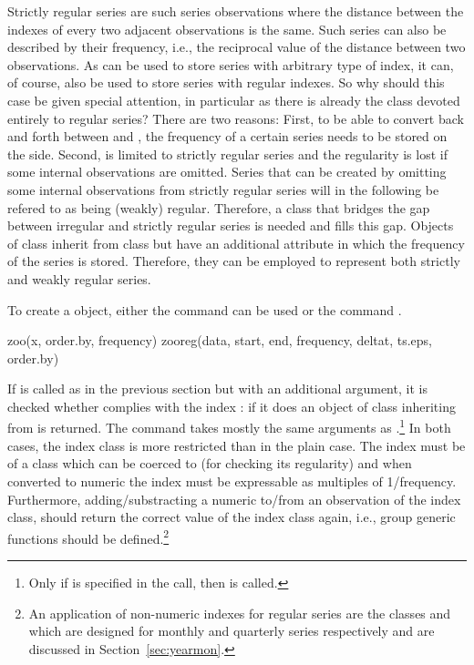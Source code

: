 \documentclass[article,nojss]{jss}
\begin{document}
Strictly regular series are such series observations where the distance between
the indexes of every two adjacent observations is the same. Such series can 
also be described by their frequency, i.e., the reciprocal value of the distance
between two observations. As  can be used to store series with arbitrary
type of index, it can, of course, also be used to store series with regular indexes.
So why should this case be given special attention, in particular as there is already
the  class devoted entirely to regular series? There are two reasons: First,
to be able to convert back and forth between  and , the frequency
of a certain series needs to be stored on the  side. Second,  is 
limited to strictly regular series and the regularity is lost if some internal observations
are omitted. Series that can be created by omitting some internal observations from strictly
regular series will in the following be refered to as being (weakly) regular.
Therefore, a class that bridges the gap between irregular and strictly regular series
is needed and  fills this gap. Objects of class  inherit
from class  but have an additional attribute  in which 
the frequency of the series is stored. Therefore, they can be employed to represent
both strictly and weakly regular series.

To create a  object, either the command  can be used
or the command .

\begin{Scode}
zoo(x, order.by, frequency)
zooreg(data, start, end, frequency, deltat, ts.eps, order.by)
\end{Scode} 

If  is called as in the previous section but with an additional
 argument, it is checked whether  complies
with the index : if it does an object of class 
inheriting from  is returned. The command  takes mostly
the same arguments as .\footnote{Only if 
is specified in the  call, then 
is called.} 
In both cases, the index class is more restricted than in the plain 
case. The index must be of a class which can be coerced to  
(for checking its regularity) and when converted to numeric 
the index must be expressable as multiples of 1/frequency. 
Furthermore, adding/substracting
a numeric to/from an observation of the index class, should return the correct value
of the index class again, i.e., group generic functions  should be defined.\footnote{An
application of non-numeric indexes for regular series are the classes 
and  which are designed for monthly and quarterly series respectively
and are discussed in Section~\ref{sec:yearmon}.}
\end{document}
